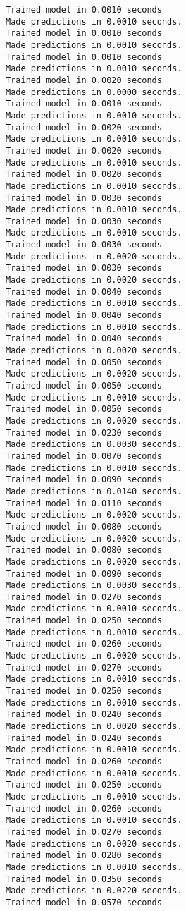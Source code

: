 \documentclass[11pt]{article}
\begin{document}
\begin{Verbatim}[commandchars=\\\{\}]
Trained model in 0.0010 seconds
Made predictions in 0.0010 seconds.
Trained model in 0.0010 seconds
Made predictions in 0.0010 seconds.
Trained model in 0.0010 seconds
Made predictions in 0.0010 seconds.
Trained model in 0.0020 seconds
Made predictions in 0.0000 seconds.
Trained model in 0.0010 seconds
Made predictions in 0.0010 seconds.
Trained model in 0.0020 seconds
Made predictions in 0.0010 seconds.
Trained model in 0.0020 seconds
Made predictions in 0.0010 seconds.
Trained model in 0.0020 seconds
Made predictions in 0.0010 seconds.
Trained model in 0.0030 seconds
Made predictions in 0.0010 seconds.
Trained model in 0.0030 seconds
Made predictions in 0.0010 seconds.
Trained model in 0.0030 seconds
Made predictions in 0.0020 seconds.
Trained model in 0.0030 seconds
Made predictions in 0.0020 seconds.
Trained model in 0.0040 seconds
Made predictions in 0.0010 seconds.
Trained model in 0.0040 seconds
Made predictions in 0.0010 seconds.
Trained model in 0.0040 seconds
Made predictions in 0.0020 seconds.
Trained model in 0.0050 seconds
Made predictions in 0.0020 seconds.
Trained model in 0.0050 seconds
Made predictions in 0.0010 seconds.
Trained model in 0.0050 seconds
Made predictions in 0.0020 seconds.
Trained model in 0.0230 seconds
Made predictions in 0.0030 seconds.
Trained model in 0.0070 seconds
Made predictions in 0.0010 seconds.
Trained model in 0.0090 seconds
Made predictions in 0.0140 seconds.
Trained model in 0.0110 seconds
Made predictions in 0.0020 seconds.
Trained model in 0.0080 seconds
Made predictions in 0.0020 seconds.
Trained model in 0.0080 seconds
Made predictions in 0.0020 seconds.
Trained model in 0.0090 seconds
Made predictions in 0.0030 seconds.
Trained model in 0.0270 seconds
Made predictions in 0.0010 seconds.
Trained model in 0.0250 seconds
Made predictions in 0.0010 seconds.
Trained model in 0.0260 seconds
Made predictions in 0.0020 seconds.
Trained model in 0.0270 seconds
Made predictions in 0.0010 seconds.
Trained model in 0.0250 seconds
Made predictions in 0.0010 seconds.
Trained model in 0.0240 seconds
Made predictions in 0.0020 seconds.
Trained model in 0.0240 seconds
Made predictions in 0.0010 seconds.
Trained model in 0.0260 seconds
Made predictions in 0.0010 seconds.
Trained model in 0.0250 seconds
Made predictions in 0.0010 seconds.
Trained model in 0.0260 seconds
Made predictions in 0.0010 seconds.
Trained model in 0.0270 seconds
Made predictions in 0.0020 seconds.
Trained model in 0.0280 seconds
Made predictions in 0.0010 seconds.
Trained model in 0.0350 seconds
Made predictions in 0.0220 seconds.
Trained model in 0.0570 seconds

\end{Verbatim}
\end{document}
